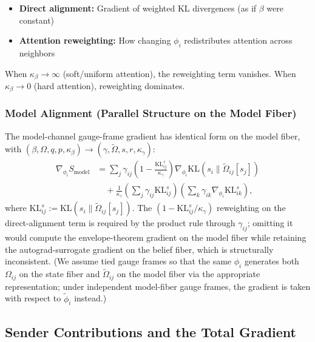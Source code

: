 \documentclass[11pt]{article}
\begin{document}
\begin{itemize}
\item \textbf{Direct alignment:} Gradient of weighted KL divergences (as if $\beta$ were constant)
\item \textbf{Attention reweighting:} How changing $\phi_i$ redistributes attention across neighbors
\end{itemize}

When $\kappa_\beta \to \infty$ (soft/uniform attention), the reweighting term vanishes. When $\kappa_\beta \to 0$ (hard attention), reweighting dominates.

\subsubsection*{Model Alignment (Parallel Structure on the Model Fiber)}

The model-channel gauge-frame gradient has identical form on the model fiber, with $(\beta, \Omega, q, p, \kappa_\beta) \to (\gamma, \tilde\Omega, s, r, \kappa_\gamma)$:
\begin{equation}
\begin{aligned}
\nabla_{\phi_i} S_{\mathrm{model}}
&= \sum_j \gamma_{ij}\left(1 - \frac{\mathrm{KL}^s_{ij}}{\kappa_\gamma}\right)\nabla_{\phi_i}\mathrm{KL}(s_i \| \tilde{\Omega}_{ij}[s_j]) \\
&\quad + \frac{1}{\kappa_\gamma}\left(\sum_j \gamma_{ij}\mathrm{KL}^s_{ij}\right)\left(\sum_k \gamma_{ik}\nabla_{\phi_i}\mathrm{KL}^s_{ik}\right),
\end{aligned}
\end{equation}
where $\mathrm{KL}^s_{ij} := \mathrm{KL}(s_i \| \tilde{\Omega}_{ij}[s_j])$. The $(1 - \mathrm{KL}^s_{ij}/\kappa_\gamma)$ reweighting on the direct-alignment term is required by the product rule through $\gamma_{ij}$; omitting it would compute the envelope-theorem gradient on the model fiber while retaining the autograd-surrogate gradient on the belief fiber, which is structurally inconsistent. (We assume tied gauge frames so that the same $\phi_i$ generates both $\Omega_{ij}$ on the state fiber and $\tilde\Omega_{ij}$ on the model fiber via the appropriate representation; under independent model-fiber gauge frames, the gradient is taken with respect to $\tilde\phi_i$ instead.)

\subsection*{Sender Contributions and the Total Gradient}
\end{document}

